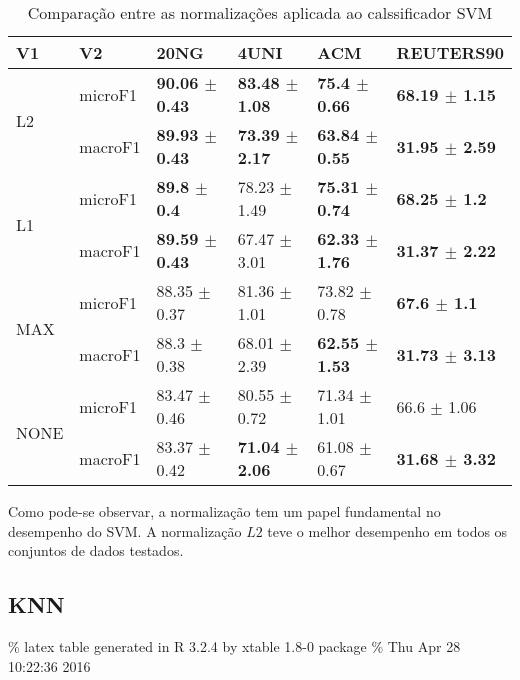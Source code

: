 \documentclass[]{book}
\begin{document}
\begin{table}[ht]
\centering
\begin{tabular}{llllll}
  \hline
V1 & V2 & 20NG & 4UNI & ACM & REUTERS90 \\ 
  \cline{3-6} \hline
\multirow{2}{*}{L2} & microF1 & \bf{90.06 $\pm$  0.43} & \bf{83.48 $\pm$  1.08} & \bf{75.4 $\pm$  0.66} & \bf{68.19 $\pm$  1.15} \\ 
   & macroF1 & \bf{89.93 $\pm$  0.43} & \bf{73.39 $\pm$  2.17} & \bf{63.84 $\pm$  0.55} & \bf{31.95 $\pm$  2.59} \\ 
   \cline{3-6}\multirow{2}{*}{L1} & microF1 & \bf{89.8 $\pm$  0.4} & 78.23 $\pm$  1.49 & \bf{75.31 $\pm$  0.74} & \bf{68.25 $\pm$  1.2} \\ 
   & macroF1 & \bf{89.59 $\pm$  0.43} & 67.47 $\pm$  3.01 & \bf{62.33 $\pm$  1.76} & \bf{31.37 $\pm$  2.22} \\ 
   \cline{3-6}\multirow{2}{*}{MAX} & microF1 & 88.35 $\pm$  0.37 & 81.36 $\pm$  1.01 & 73.82 $\pm$  0.78 & \bf{67.6 $\pm$  1.1} \\ 
   & macroF1 & 88.3 $\pm$  0.38 & 68.01 $\pm$  2.39 & \bf{62.55 $\pm$  1.53} & \bf{31.73 $\pm$  3.13} \\ 
   \cline{3-6}\multirow{2}{*}{NONE} & microF1 & 83.47 $\pm$  0.46 & 80.55 $\pm$  0.72 & 71.34 $\pm$  1.01 & 66.6 $\pm$  1.06 \\ 
   & macroF1 & 83.37 $\pm$  0.42 & \bf{71.04 $\pm$  2.06} & 61.08 $\pm$  0.67 & \bf{31.68 $\pm$  3.32} \\ 
   \cline{3-6}\end{tabular}
\caption{Comparação entre as normalizações aplicada ao calssificador SVM} 
\end{table}

Como pode-se observar, a normalização tem um papel fundamental no
desempenho do SVM. A normalização \(L2\) teve o melhor desempenho em
todos os conjuntos de dados testados.

\subsection{KNN}\label{knn}

\% latex table generated in R 3.2.4 by xtable 1.8-0 package \% Thu Apr
28 10:22:36 2016
\end{document}
